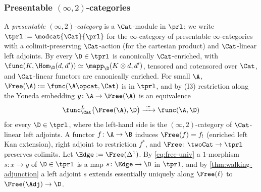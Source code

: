 \subsubsection*{Presentable $(\infty,2)$-categories}
A \emph{presentable $(\infty,2)$-category} is a $\Cat$-module in $\prl$; we write $\tprl := \modcat{\Cat}{\prl}$ for the $\infty$-category of presentable $\infty$-categories with a colimit-preserving $\Cat$-action (for the cartesian product) and $\Cat$-linear left adjoints.
By \cite{gepnerhaugseng2015enriched,heine2023enriched} every $\D \in \tprl$ is canonically $\Cat$-enriched, with $\func(K,\Hom_{\D}(d,d')) \simeq \mapp_{\D}(K \otimes d,d')$, tensored and cotensored over $\Cat$, and $\Cat$-linear functors are canonically enriched.
For small $\A$, $\Free(\A) := \func(\A\opcat,\Cat)$ is in $\tprl$, and by (I3) restriction along the Yoneda embedding $y\colon \A \to \Free(\A)$ is an equivalence
\begin{equation}
\label{eq:free-univ}
\func^{L}_{\Cat}\bigl(\Free(\A),\D\bigr) \xrightarrow{\ \simeq\ } \func(\A,\D)
\end{equation}
for every $\D \in \tprl$, where the left-hand side is the $(\infty,2)$-category of $\Cat$-linear left adjoints.
A functor $f\colon \A \to \B$ induces $\Free(f) = f_{!}$ (enriched left Kan extension), right adjoint to restriction $f^{*}$, and $\Free\colon \twoCat \to \tprl$ preserves colimits.
Let $\Edge := \Free(\Delta^{1})$. By \eqref{eq:free-univ} a $1$-morphism $s\colon x \to y$ of $\D \in \tprl$ is a map $s\colon \Edge \to \D$ in $\tprl$, and by \cref{thm:walking-adjunction} a left adjoint $s$ extends essentially uniquely along $\Free(\ell)$ to $\Free(\Adj) \to \D$.
